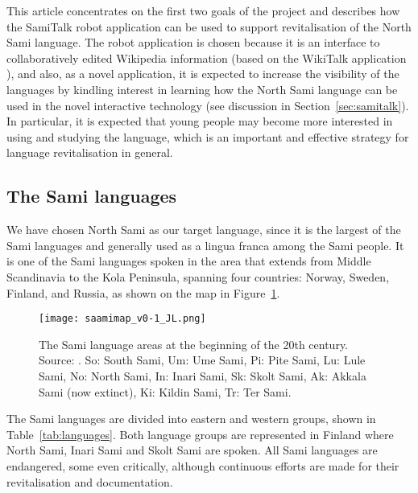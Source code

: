 \documentclass[runningheads,a4paper]{llncs}
\begin{document}
This article concentrates on the first two goals of the project and describes how the SamiTalk robot application can be used to support revitalisation of the North Sami language. The robot application is chosen because it is an interface to collaboratively edited Wikipedia information (based on the WikiTalk application \cite{Wilcock:QACD:12,Jokinen:Wilcock:IWSDS:12}), and also, as a novel application, it is expected to increase the visibility of the languages by kindling interest in learning how the North Sami language can be used in the novel interactive technology (see discussion in Section~\ref{sec:samitalk}). In particular, it is expected that young people may become more interested in using and studying the language, which is an important and effective strategy for language revitalisation in general.

\subsection{The Sami languages}
\label{sec:sami-languages}

We have chosen North Sami as our target language, since it is the largest of the Sami languages and generally used as a lingua franca among the Sami people.
It is one of the Sami languages spoken in the area that extends from Middle Scandinavia to the Kola Peninsula, spanning four countries: Norway, Sweden, Finland, and Russia,
as shown on the map in Figure~\ref{fig:sami-map}.

\begin{figure}[htb]
\centering
\texttt{[image: saamimap\_v0-1\_JL.png]}
\caption{The Sami language areas at the beginning of the 20th century. Source: \cite{Sammallahti:98}.
\newline So: South Sami, Um: Ume Sami, Pi: Pite Sami, Lu: Lule Sami, No: North Sami,
\newline In: Inari Sami, Sk: Skolt Sami, Ak: Akkala Sami (now extinct), Ki: Kildin Sami,
\newline Tr: Ter Sami.}
\label{fig:sami-map}
\end{figure}


The Sami languages are divided into eastern and western groups, shown in Table~\ref{tab:languages}.
Both language groups are represented in Finland where North Sami, Inari Sami and Skolt Sami are spoken. All Sami languages are endangered, some even critically, although continuous efforts are made for their revitalisation and documentation.
\end{document}
